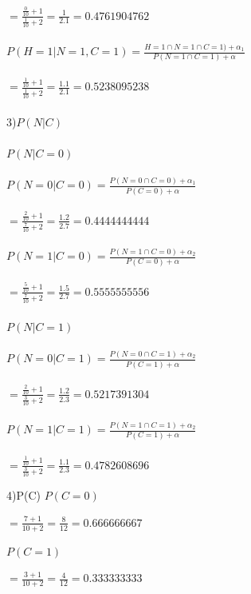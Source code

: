 \documentclass[a4paper]{article}
\begin{document}
$=\frac{\frac{0}{10}+1}{\frac{1}{10}+2}=\frac{1}{2.1}=0.4761904762$
\\
\\
$P(H=1 | N=1,C=1) = \frac{H=1 \cap  N=1 \cap  C=1) +\alpha_1}{P(N=1 \cap C=1) +\alpha}$
\\
\\
$=\frac{\frac{1}{10}+1}{\frac{1}{10}+2}=\frac{1.1}{2.1}=0.5238095238$
\\
\\
3)$P(N | C)$
\\
\\
$P(N | C=0)$
\\
\\
$P(N=0 | C=0) = \frac{P(N=0 \cap  C=0) +\alpha_1}{P(C=0) +\alpha}$
\\
\\
$=\frac{\frac{2}{10}+1}{\frac{7}{10}+2}=\frac{1.2}{2.7}=0.4444444444$
\\
\\
$P(N=1 | C=0) = \frac{P(N=1 \cap  C=0) +\alpha_2}{P(C=0) +\alpha}$
\\
\\
$=\frac{\frac{5}{10}+1}{\frac{7}{10}+2}=\frac{1.5}{2.7}= 0.5555555556$
\\
\\
$P(N | C=1)$
\\
\\
$P(N=0 | C=1) = \frac{P(N=0 \cap  C=1) +\alpha_2}{P(C=1) +\alpha}$
\\
\\
$=\frac{\frac{2}{10}+1}{\frac{3}{10}+2}=\frac{1.2}{2.3}= 0.5217391304$
\\
\\
$P(N=1 | C=1) =\frac{P(N=1 \cap  C=1) +\alpha_2}{P(C=1) +\alpha}$
\\
\\
$=\frac{\frac{1}{10}+1}{\frac{3}{10}+2}=\frac{1.1}{2.3}= 0.4782608696$

4)P(C)
$P(C=0)$

$=\frac{7+1}{10+2}=\frac{8}{12}=0.666666667$

$P(C=1)$

$=\frac{3+1}{10+2}=\frac{4}{12}=0.333333333$
\end{document}
